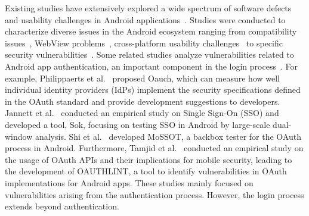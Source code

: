  Existing studies have extensively explored a wide spectrum of software defects and usability challenges in Android applications~\cite{Alsanousi2023,10679403,10.1145/3386685}. Studies were conducted to characterize diverse issues in the Android ecosystem ranging from compatibility issues~\cite{huang2023conffix,mahmud2023detecting,yang2023compatibility,chen2024demystifyingdevicespecificcompatibilityissues}, WebView problems~\cite{luo2011attacks,8999997,hu2023omegatest}, cross-platform usability challenges~\cite{steinbock2024comparing,chen2024your,yu2021layout} to specific security vulnerabilities~\cite{10.1145/3545948.3545955,10504267,7589802,10.1145/3301285,10.1145/3321705.3329831,10738442,7962350}.
 Some related studies analyze vulnerabilities related to Android app authentication, an important component in the login process~\cite{10.1145/3551349.3559524,10628996,10.1145/3321705.3329801,8952200}.
 For example, Philippaerts et al.~\cite{10.1145/3551349.3559524} proposed Oauch, which can measure how well individual identity providers (IdPs) implement the security specifications defined in the OAuth standard and provide development suggestions to developers.
 Jannett et al.~\cite{10628996} conducted an empirical study on Single Sign-On (SSO) and developed a tool, Sok, focusing on testing SSO in Android by large-scale dual-window analysis. 
 Shi et al.~\cite{10.1145/3321705.3329801} developed MoSSOT, a backbox tester for the OAuth process in Android. Furthermore, Tamjid et al.~\cite{8952200} conducted an empirical study on the usage of OAuth APIs and their implications for mobile security, leading to the development of OAUTHLINT, a tool to identify vulnerabilities in OAuth implementations for Android apps. These studies mainly focused on vulnerabilities arising from the authentication process.
 However, the login process extends beyond authentication.

